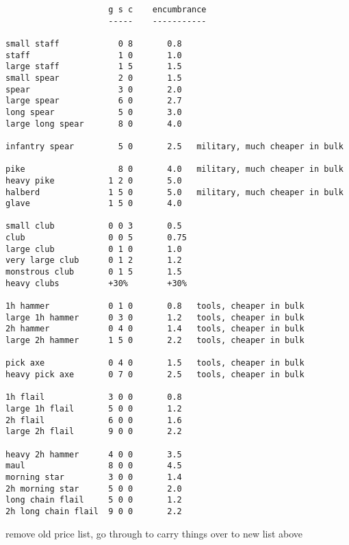 \small \begin{verbatim}
                     g s c    encumbrance
                     -----    -----------

small staff            0 8       0.8
staff                  1 0       1.0
large staff            1 5       1.5
small spear            2 0       1.5
spear                  3 0       2.0
large spear            6 0       2.7
long spear             5 0       3.0
large long spear       8 0       4.0

infantry spear         5 0       2.5   military, much cheaper in bulk

pike                   8 0       4.0   military, much cheaper in bulk
heavy pike           1 2 0       5.0
halberd              1 5 0       5.0   military, much cheaper in bulk
glave                1 5 0       4.0

small club           0 0 3       0.5
club                 0 0 5       0.75
large club           0 1 0       1.0
very large club      0 1 2       1.2
monstrous club       0 1 5       1.5
heavy clubs          +30%        +30%

1h hammer            0 1 0       0.8   tools, cheaper in bulk
large 1h hammer      0 3 0       1.2   tools, cheaper in bulk
2h hammer            0 4 0       1.4   tools, cheaper in bulk
large 2h hammer      1 5 0       2.2   tools, cheaper in bulk

pick axe             0 4 0       1.5   tools, cheaper in bulk
heavy pick axe       0 7 0       2.5   tools, cheaper in bulk

1h flail             3 0 0       0.8
large 1h flail       5 0 0       1.2
2h flail             6 0 0       1.6
large 2h flail       9 0 0       2.2

heavy 2h hammer      4 0 0       3.5
maul                 8 0 0       4.5
morning star         3 0 0       1.4
2h morning star      5 0 0       2.0
long chain flail     5 0 0       1.2
2h long chain flail  9 0 0       2.2
\end{verbatim} \normalsize
\pagebreak[1]


\TODO remove old price list, go through to carry things over to new list above


